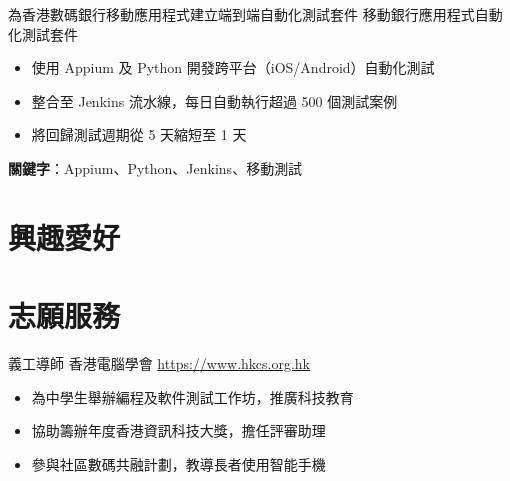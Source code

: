 \documentclass[a4paper, serif, 10pt]{moderncv}
\begin{document}
        {為香港數碼銀行移動應用程式建立端到端自動化測試套件}
        {移動銀行應用程式自動化測試套件}
        {}
        {}
        {\begin{itemize}
\item 使用 Appium 及 Python 開發跨平台（iOS/Android）自動化測試
\item 整合至 Jenkins 流水線，每日自動執行超過 500 個測試案例
\item 將回歸測試週期從 5 天縮短至 1 天
\end{itemize}
\textbf{關鍵字}：Appium、Python、Jenkins、移動測試}
\section{興趣愛好}

\section{志願服務}

        {義工導師}
        {香港電腦學會}
        {\url{https://www.hkcs.org.hk}}
        {}
        {\begin{itemize}
\item 為中學生舉辦編程及軟件測試工作坊，推廣科技教育
\item 協助籌辦年度香港資訊科技大獎，擔任評審助理
\item 參與社區數碼共融計劃，教導長者使用智能手機
\end{itemize}}
    
\end{document}

